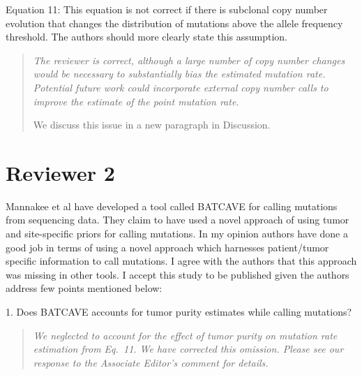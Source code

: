 \documentclass[11pt]{article}
\newenvironment{response}
{\begin{quote}\itshape}
{\end{quote}}
\begin{document}
Equation 11: This equation is not correct if there is subclonal copy number evolution that changes the distribution of mutations above the allele frequency threshold. The authors should more clearly state this assumption.
\begin{response}
The reviewer is correct, although a large number of copy number changes would be necessary to substantially bias the estimated mutation rate.
Potential future work could incorporate external copy number calls to improve the estimate of the point mutation rate.

We discuss this issue in a new paragraph in Discussion.
\end{response}

\section*{Reviewer 2}

Mannakee et al have developed a tool called BATCAVE for calling mutations from sequencing data. They claim to have used a novel approach of using tumor and site-specific priors for calling mutations. In my opinion authors have done a good job in terms of using a novel approach which harnesses patient/tumor specific information to call mutations. I agree with the authors that this approach was missing in other tools. I accept this study to be published given the authors address few points mentioned below:

1. Does BATCAVE accounts for tumor purity estimates while calling mutations?
\begin{response}
We neglected to account for the effect of tumor purity on mutation rate estimation from Eq.~11.
We have corrected this omission.
Please see our response to the Associate Editor's comment for details.
\end{response}
\end{document}
